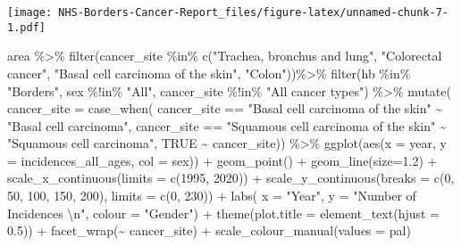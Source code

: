 \documentclass[
]{article}
\newenvironment{Shaded}{\begin{snugshade}}{\end{snugshade}}
\newcommand{\AttributeTok}[1]{\textcolor[rgb]{0.77,0.63,0.00}{#1}}
\newcommand{\ConstantTok}[1]{\textcolor[rgb]{0.00,0.00,0.00}{#1}}
\newcommand{\DecValTok}[1]{\textcolor[rgb]{0.00,0.00,0.81}{#1}}
\newcommand{\FloatTok}[1]{\textcolor[rgb]{0.00,0.00,0.81}{#1}}
\newcommand{\FunctionTok}[1]{\textcolor[rgb]{0.00,0.00,0.00}{#1}}
\newcommand{\NormalTok}[1]{#1}
\newcommand{\SpecialCharTok}[1]{\textcolor[rgb]{0.00,0.00,0.00}{#1}}
\newcommand{\StringTok}[1]{\textcolor[rgb]{0.31,0.60,0.02}{#1}}
\begin{document}
\texttt{[image: NHS-Borders-Cancer-Report\_files/figure-latex/unnamed-chunk-7-1.pdf]}

\begin{Shaded}
\begin{Highlighting}[]
\NormalTok{area }\SpecialCharTok{\%\textgreater{}\%} 
  \FunctionTok{filter}\NormalTok{(cancer\_site }\SpecialCharTok{\%in\%} \FunctionTok{c}\NormalTok{(}\StringTok{"Trachea, bronchus and lung"}\NormalTok{,}
                            \StringTok{"Colorectal cancer"}\NormalTok{,}
                            \StringTok{"Basal cell carcinoma of the skin"}\NormalTok{,}
                            \StringTok{"Colon"}\NormalTok{))}\SpecialCharTok{\%\textgreater{}\%}
  \FunctionTok{filter}\NormalTok{(hb }\SpecialCharTok{\%in\%} \StringTok{"Borders"}\NormalTok{,}
\NormalTok{         sex }\SpecialCharTok{\%!in\%} \StringTok{"All"}\NormalTok{,}
\NormalTok{         cancer\_site }\SpecialCharTok{\%!in\%} \StringTok{"All cancer types"}\NormalTok{) }\SpecialCharTok{\%\textgreater{}\%} 
  \FunctionTok{mutate}\NormalTok{(}
  \AttributeTok{cancer\_site =} \FunctionTok{case\_when}\NormalTok{(}
\NormalTok{    cancer\_site }\SpecialCharTok{==} \StringTok{"Basal cell carcinoma of the skin"} \SpecialCharTok{\textasciitilde{}} \StringTok{"Basal cell carcinoma"}\NormalTok{,}
\NormalTok{    cancer\_site }\SpecialCharTok{==} \StringTok{"Squamous cell carcinoma of the skin"} \SpecialCharTok{\textasciitilde{}} \StringTok{"Squamous cell carcinoma"}\NormalTok{,}
    \ConstantTok{TRUE} \SpecialCharTok{\textasciitilde{}}\NormalTok{ cancer\_site)) }\SpecialCharTok{\%\textgreater{}\%} 
  \FunctionTok{ggplot}\NormalTok{(}\FunctionTok{aes}\NormalTok{(}\AttributeTok{x =}\NormalTok{ year, }\AttributeTok{y =}\NormalTok{ incidences\_all\_ages, }\AttributeTok{col =}\NormalTok{ sex)) }\SpecialCharTok{+}
  \FunctionTok{geom\_point}\NormalTok{() }\SpecialCharTok{+}
  \FunctionTok{geom\_line}\NormalTok{(}\AttributeTok{size=}\FloatTok{1.2}\NormalTok{) }\SpecialCharTok{+}
  \FunctionTok{scale\_x\_continuous}\NormalTok{(}\AttributeTok{limits =} \FunctionTok{c}\NormalTok{(}\DecValTok{1995}\NormalTok{, }\DecValTok{2020}\NormalTok{)) }\SpecialCharTok{+}
  \FunctionTok{scale\_y\_continuous}\NormalTok{(}\AttributeTok{breaks =} \FunctionTok{c}\NormalTok{(}\DecValTok{0}\NormalTok{, }\DecValTok{50}\NormalTok{, }\DecValTok{100}\NormalTok{, }\DecValTok{150}\NormalTok{, }\DecValTok{200}\NormalTok{), }\AttributeTok{limits =} \FunctionTok{c}\NormalTok{(}\DecValTok{0}\NormalTok{, }\DecValTok{230}\NormalTok{)) }\SpecialCharTok{+}
  \FunctionTok{labs}\NormalTok{(}
       \AttributeTok{x =} \StringTok{"Year"}\NormalTok{,}
       \AttributeTok{y =} \StringTok{"Number of Incidences }\SpecialCharTok{\textbackslash{}n}\StringTok{"}\NormalTok{,}
       \AttributeTok{colour =} \StringTok{"Gender"}\NormalTok{) }\SpecialCharTok{+}
  \FunctionTok{theme}\NormalTok{(}\AttributeTok{plot.title =} \FunctionTok{element\_text}\NormalTok{(}\AttributeTok{hjust =} \FloatTok{0.5}\NormalTok{)) }\SpecialCharTok{+}
  \FunctionTok{facet\_wrap}\NormalTok{(}\SpecialCharTok{\textasciitilde{}}\NormalTok{ cancer\_site) }\SpecialCharTok{+}
  \FunctionTok{scale\_colour\_manual}\NormalTok{(}\AttributeTok{values =}\NormalTok{ pal)}
\end{Highlighting}
\end{Shaded}
\end{document}
